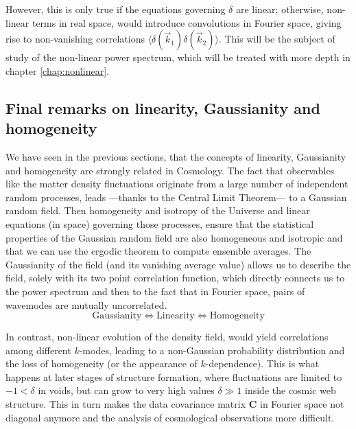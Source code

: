 However, this is only true if the equations governing $\delta$ are linear; otherwise, non-linear terms in real space,
would introduce convolutions in Fourier space, giving rise to non-vanishing correlations $\langle \delta (\vec{k}_1)  \delta (\vec{k}_2) \rangle$. This will be the subject of study of the non-linear power spectrum, which will be treated with more depth in chapter \ref{chap:nonlinear}.

\subsection{Final remarks on linearity, Gaussianity and homogeneity}

We have seen in the previous sections, that the concepts of linearity, Gaussianity and homogeneity
are strongly related in Cosmology.
The fact that observables like the matter density fluctuations originate from a large number 
of independent random processes, leads ---thanks to the Central Limit Theorem--- to a Gaussian random field.
Then homogeneity and isotropy of the Universe and linear equations (in space) governing those processes, ensure that the statistical properties of the Gaussian random field
are also homogeneous and isotropic and that we can use the ergodic theorem to compute ensemble averages.
The Gaussianity of the field (and its vanishing average value) allows us to describe the field, solely with its two
point correlation function, which directly connects us to the power spectrum and then to the fact that in Fourier space, 
pairs of wavemodes are mutually uncorrelated.
\begin{equation}
\textrm{Gaussianity}\Leftrightarrow\textrm{Linearity}\Leftrightarrow\textrm{Homogeneity}
\end{equation}

In contrast, non-linear evolution of the density field, would yield correlations among different $k$-modes, 
leading to a non-Gaussian probability distribution and the loss of homogeneity (or the appearance of $k$-dependence).
This is what happens at later stages of structure formation, 
where fluctuations are limited to $-1 < \delta$ in voids, 
but can grow to very high values $\delta \gg 1$ inside the cosmic web structure.
This in turn makes the data covariance matrix $\mathbf{C}$ in Fourier space not diagonal anymore and the analysis of cosmological observations more difficult.



